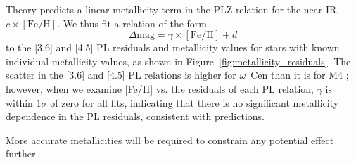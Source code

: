 \documentclass[a4paper,fleqn,usenatbib]{mnras}
\begin{document}
Theory predicts a linear metallicity term in the PLZ relation for the near-IR, $c\times[\text{Fe/H}]$.
We thus fit a relation of the form
\begin{equation}
\Delta\text{mag} = \gamma \times[\text{Fe/H}] + d
\end{equation}
to the [3.6] and [4.5] PL residuals and metallicity values for stars with known individual metallicity values, as shown in Figure~\ref{fig:metallicity_residuals}. The scatter in the [3.6] and [4.5] PL relations is higher for $\omega$~Cen than it is for M4 \citep{2015ApJ...808...11N, 2015ApJ...799..165B}; however, when we examine [Fe/H] vs. the residuals of each PL relation, $\gamma$ is within $1\sigma$ of zero for all fits, indicating that there is no significant metallicity dependence in the PL residuals, consistent with predictions.


More accurate metallicities will be required to constrain any potential effect further.
\end{document}
